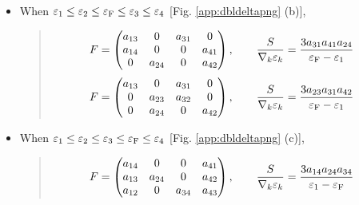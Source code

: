 \documentclass[letterpaper,10pt,pdftex,openany,english]{sphinxmanual}
\begin{document}
\begin{itemize}
\item {} 
\sphinxAtStartPar
When \(\varepsilon_1 \leq \varepsilon_2 \leq \varepsilon_{\rm F} \leq \varepsilon_3 \leq\varepsilon_4\)
{[}Fig. \ref{app:dbldeltapng} (b){]},
\begin{quote}
\begin{equation*}
\begin{split}\begin{align}
F &=
\begin{pmatrix}
a_{1 3} &       0 & a_{3 1} & 0 \\
a_{1 4} &       0 &       0 & a_{4 1} \\
0 & a_{2 4} &       0 & a_{4 2}
\end{pmatrix},
\qquad
\frac{S}{\nabla_k \varepsilon_k} = \frac{3 a_{3 1} a_{4 1} a_{2 4}}{\varepsilon_{\rm F} - \varepsilon_1}
\end{align}\end{split}
\end{equation*}\begin{equation*}
\begin{split}\begin{align}
F &=
\begin{pmatrix}
a_{1 3} &       0 & a_{3 1} & 0 \\
0 & a_{2 3} & a_{3 2} & 0 \\
0 & a_{2 4} &       0 & a_{4 2}
\end{pmatrix},
\qquad
\frac{S}{\nabla_k \varepsilon_k} = \frac{3 a_{2 3} a_{3 1} a_{4 2}}{\varepsilon_{\rm F} - \varepsilon_1}
\end{align}\end{split}
\end{equation*}\end{quote}

\item {} 
\sphinxAtStartPar
When \(\varepsilon_1 \leq \varepsilon_2 \leq \varepsilon_3 \leq \varepsilon_{\rm F} \leq \varepsilon_4\)
{[}Fig. \ref{app:dbldeltapng} (c){]},
\begin{quote}
\begin{equation*}
\begin{split}\begin{align}
F &=
\begin{pmatrix}
a_{1 4} &       0 &       0 & a_{4 1} \\
a_{1 3} & a_{2 4} &       0 & a_{4 2} \\
a_{1 2} &       0 & a_{3 4} & a_{4 3}
\end{pmatrix},
\qquad
\frac{S}{\nabla_k \varepsilon_k} = \frac{3 a_{1 4} a_{2 4} a_{3 4}}{\varepsilon_1 - \varepsilon_{\rm F}}
\end{align}\end{split}
\end{equation*}\end{quote}

\end{itemize}
\end{document}
